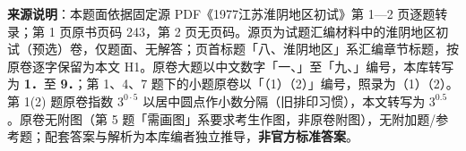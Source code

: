 


\begin{gktip}
\textbf{来源说明}：本题面依据固定源 PDF《1977江苏淮阴地区初试》第 1—2 页逐题转录；第 1 页原书页码 243，第 2 页无页码。源页为试题汇编材料中的淮阴地区初试（预选）卷，仅题面、无解答；页首标题「八、淮阴地区」系汇编章节标题，按原卷逐字保留为本文 H1。原卷大题以中文数字「一、」至「九、」编号，本库转写为 \textbf{1．}至 \textbf{9．}；第 1、4、7 题下的小题原卷以「（1）（2）」编号，照录为（1）（2）。第 1(2) 题原卷指数 $3^{0\cdot 5}$ 以居中圆点作小数分隔（旧排印习惯），本文转写为 $3^{0.5}$。原卷无附图（第 5 题「需画图」系要求考生作图，非原卷附图），无附加题/参考题；配套答案与解析为本库编者独立推导，\textbf{非官方标准答案}。
\end{gktip}

\par\medskip

